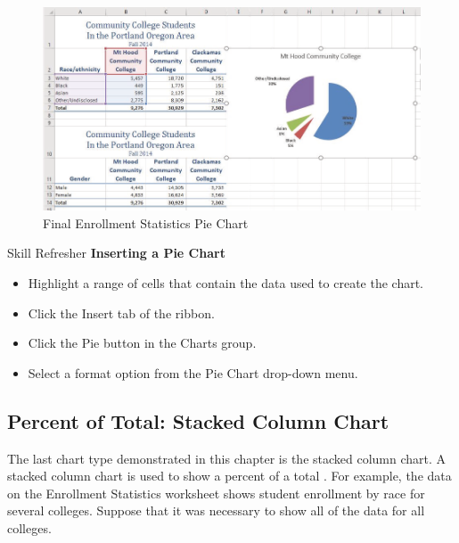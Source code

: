 \begin{figure}[H]
	\centering
	\includegraphics[width=\maxwidth{.95\linewidth}]{gfx/ch04_fig22}
	\caption{Final Enrollment Statistics Pie Chart}
	\label{04:fig22}
\end{figure}

\begin{center}
	\begin{sklbox}{Skill Refresher}
		\textbf{Inserting a Pie Chart}
		\\
		\begin{itemize}
			\setlength{\itemsep}{0pt}
			\setlength{\parskip}{0pt}
			\setlength{\parsep}{0pt}

			\item Highlight a range of cells that contain the data used to create the chart.
			\item Click the Insert tab of the ribbon.
			\item Click the Pie button in the Charts group.
			\item Select a format option from the Pie Chart drop-down menu.
			
		\end{itemize}
	\end{sklbox}
\end{center}

\subsection{Percent of Total: Stacked Column Chart}

The last chart type demonstrated in this chapter is the stacked column chart. A stacked column chart is used  to show a percent of a total . For example, the data on the Enrollment Statistics worksheet shows student enrollment by race for several colleges. Suppose that it was necessary to show all of the data for all colleges.


